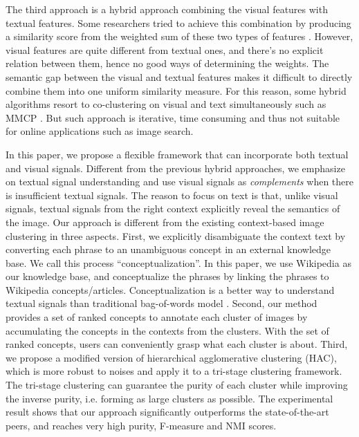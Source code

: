 The third approach is a hybrid approach combining the visual features
with textual features. Some researchers tried to achieve this combination by
producing a similarity score from the weighted sum of these two types
of features \cite{LeukenPOZ09}.
However, visual features are quite different from textual ones,
and there's no explicit relation between them, hence no good ways of
determining the weights. The semantic gap between the visual and textual features
makes it difficult to directly combine them into one uniform similarity measure.
For this reason, some hybrid algorithms resort to co-clustering on
visual and text simultaneously such as MMCP \cite{Fu2011}. 
But such approach is iterative, time consuming and
thus not suitable for online applications such as image search.

In this paper, we propose a flexible framework that can incorporate both
textual and visual signals. Different from the previous hybrid approaches,
we emphasize on textual signal understanding and use visual signals
as {\em complements} when there is insufficient textual signals. 
The reason to focus on text is that, unlike visual signals, 
textual signals from the right context explicitly reveal the semantics of the image.
Our approach is different from the existing context-based image clustering
in three aspects. First, we explicitly disambiguate the context text
by converting each phrase to an unambiguous concept in an external knowledge base.
We call this process ``conceptualization''. In this paper, we use
Wikipedia \cite{wikipedia} as our knowledge base,
and conceptualize the phrases by linking the phrases to
Wikipedia concepts/articles. Conceptualization is a better way to understand
textual signals than traditional bag-of-words model \cite{Song11:Conceptualize,
WangWWZ12:tables,WangLWZ12:topic}.
Second, our method provides a set of ranked concepts to annotate
each cluster of images by accumulating the concepts in the contexts from the clusters.
With the set of ranked concepts, users can conveniently grasp what each
cluster is about. Third, we propose a modified version of
hierarchical agglomerative clustering (HAC), which is more robust to noises
and apply it to a tri-stage clustering framework.
The tri-stage clustering can guarantee the purity of each cluster while
improving the inverse purity, i.e. forming as large clusters as possible.
The experimental result shows that our approach significantly outperforms
the state-of-the-art peers, and reaches very high purity, F-measure and
NMI scores.

